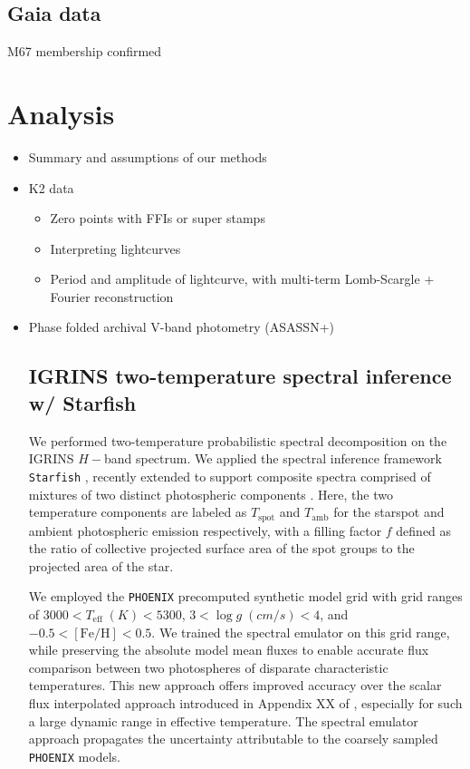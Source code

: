 \documentclass[twocolumn]{emulateapj}%
\begin{document}
\subsection{Gaia data}
M67 membership confirmed


\section{Analysis}
\begin{itemize}
\item Summary and assumptions of our methods
\item K2 data
\begin{itemize}
  \item Zero points with FFIs or super stamps
  \item Interpreting lightcurves
  \item Period and amplitude of lightcurve, with multi-term Lomb-Scargle + Fourier reconstruction
\end{itemize}
\item Phase folded archival V-band photometry (ASASSN+)
\subsection{IGRINS two-temperature spectral inference w/ Starfish}

We performed two-temperature probabilistic spectral decomposition on the IGRINS $H-$band spectrum.  We applied the spectral inference framework \texttt{Starfish} \citep{czekala15}, recently extended to support composite spectra comprised of mixtures of two distinct photospheric components \citep{gullysantiago17}.  Here, the two temperature components are labeled as $T_{\mathrm{spot}}$ and $T_{\mathrm{amb}}$ for the starspot and ambient photospheric emission respectively, with a filling factor $f$ defined as the ratio of collective projected surface area of the spot groups to the projected area of the star.

We employed the \texttt{PHOENIX} precomputed synthetic model grid with grid ranges of $3000 < T_{\mathrm{eff}} \; (K) < 5300 $, $3 < \log{g \;(cm/s)}  < 4 $, and $ -0.5 <  [\mathrm{Fe}/\mathrm{H}] <0.5$.  We trained the spectral emulator \citep{czekala15} on this grid range, while preserving the absolute model mean fluxes to enable accurate flux comparison between two photospheres of disparate characteristic temperatures.  This new approach offers improved accuracy over the scalar flux interpolated approach introduced in Appendix XX of \citet{gullysantiago17}, especially for such a large dynamic range in effective temperature.  The spectral emulator approach propagates the uncertainty attributable to the coarsely sampled \texttt{PHOENIX} models.


\end{itemize}
\end{document}
